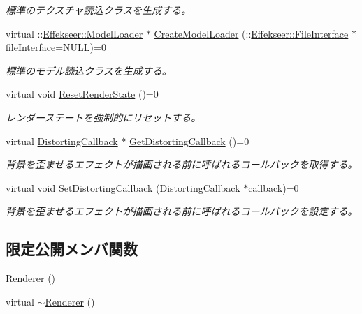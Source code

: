 \begin{DoxyCompactItemize}
\begin{DoxyCompactList}\small\item\em 標準のテクスチャ読込クラスを生成する。 \end{DoxyCompactList}\item 
virtual \+::\mbox{\hyperlink{class_effekseer_1_1_model_loader}{Effekseer\+::\+Model\+Loader}} $\ast$ \mbox{\hyperlink{class_effekseer_renderer_1_1_renderer_ab35779830c25992af7a9a9d53423f817}{Create\+Model\+Loader}} (\+::\mbox{\hyperlink{class_effekseer_1_1_file_interface}{Effekseer\+::\+File\+Interface}} $\ast$file\+Interface=N\+U\+LL)=0
\begin{DoxyCompactList}\small\item\em 標準のモデル読込クラスを生成する。 \end{DoxyCompactList}\item 
virtual void \mbox{\hyperlink{class_effekseer_renderer_1_1_renderer_a229d0aca027c72e6736db487efbbddeb}{Reset\+Render\+State}} ()=0
\begin{DoxyCompactList}\small\item\em レンダーステートを強制的にリセットする。 \end{DoxyCompactList}\item 
virtual \mbox{\hyperlink{class_effekseer_renderer_1_1_distorting_callback}{Distorting\+Callback}} $\ast$ \mbox{\hyperlink{class_effekseer_renderer_1_1_renderer_af4db92a0262062bfcc8f3f2334e5a168}{Get\+Distorting\+Callback}} ()=0
\begin{DoxyCompactList}\small\item\em 背景を歪ませるエフェクトが描画される前に呼ばれるコールバックを取得する。 \end{DoxyCompactList}\item 
virtual void \mbox{\hyperlink{class_effekseer_renderer_1_1_renderer_a8806b5a83c5ea73e09662f4a0869f8f0}{Set\+Distorting\+Callback}} (\mbox{\hyperlink{class_effekseer_renderer_1_1_distorting_callback}{Distorting\+Callback}} $\ast$callback)=0
\begin{DoxyCompactList}\small\item\em 背景を歪ませるエフェクトが描画される前に呼ばれるコールバックを設定する。 \end{DoxyCompactList}\end{DoxyCompactItemize}
\subsection*{限定公開メンバ関数}
\begin{DoxyCompactItemize}
\item 
\mbox{\hyperlink{class_effekseer_renderer_1_1_renderer_ac28b8a076c8ae3ee80e47cfa41a5b725}{Renderer}} ()
\item 
virtual \mbox{\hyperlink{class_effekseer_renderer_1_1_renderer_ad85143b942b06b4fa4741713f7bcd84b}{$\sim$\+Renderer}} ()
\end{DoxyCompactItemize}


